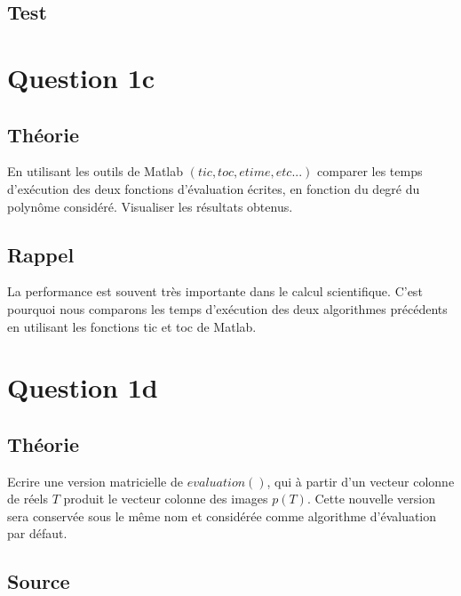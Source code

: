 \documentclass[a4paper,10pt]{report}
\begin{document}
\subsection*{Test}

\section*{Question 1c}

\subsection*{Théorie}

En utilisant les outils de Matlab $(tic, toc, etime, etc...)$ comparer les temps
d’exécution des deux fonctions d’évaluation écrites, en fonction du degré
du polynôme considéré. Visualiser les résultats obtenus.

\subsection*{Rappel}

La performance est souvent très importante dans le calcul scientifique. C’est pourquoi nous comparons les temps d’exécution des deux algorithmes précédents en utilisant les fonctions tic et toc de Matlab.

\section*{Question 1d}

\subsection*{Théorie}

Ecrire une version matricielle de $evaluation()$, qui à partir d’un vecteur
colonne de réels $T$ produit le vecteur colonne des images $p(T)$. Cette nouvelle
version sera conservée sous le même nom et considérée comme algorithme
d’évaluation par défaut.

\subsection*{Source}
\end{document}
